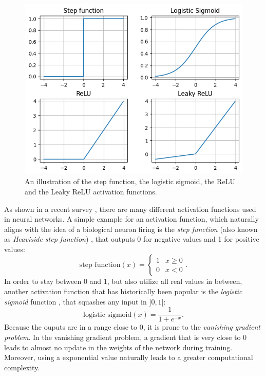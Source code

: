 \begin{figure}
\centering
	\includegraphics[width=0.8\linewidth]{activation-functions.png}
	\caption{An illustration of the step function, the logistic sigmoid, the ReLU and the Leaky ReLU activation functions.}
	\label{activation_functions}
\end{figure}

As shown in a recent survey \cite{activation_functions}, there are many different activation functions used in neural networks. A simple example for an activation function, which naturally aligns with the idea of a biological neuron firing is the \textit{step function} (also known as \textit{Heaviside step function}) \cite{neural_networks_pattern_recognition}, that outputs 0 for negative values and 1 for positive values:
$$\text{step function}(x) = 
\begin{cases}
    1 & x \geq 0\\
    0 & x < 0
\end{cases}.
$$
In order to stay between 0 and 1, but also utilize all real values in between, another activation function that has historically been popular is the \textit{logistic sigmoid} function \cite{activation_functions}, that squashes any input in $]0, 1[$:
$$\text{logistic sigmoid}(x) = \frac{1}{1 + e^{-x}}.$$
Because the ouputs are in a range close to 0, it is prone to the \textit{vanishing gradient problem}. In the vanishing gradient problem, a gradient that is very close to 0 leads to almost no update in the weights of the network during training. Moreover, using a exponential value naturally leads to a greater computational complexity. \cite{activation_functions}

